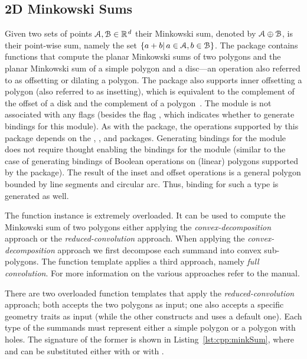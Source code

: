 \subsection{2D Minkowski Sums}
\label{ssec:modules:ms2}
Given two sets of points $\calA, \calB \in \Rd$ their Minkowski sum, denoted by ${\cal A} \oplus {\cal B}$, is their point-wise sum, namely the set $\{a+b |\, a \in {\cal A},b \in {\cal B}\}$. The \cgal{} package \iiDMinkowskiSumsPackage{} contains functions that compute the planar Minkowski sums of two polygons and the planar Minkowski sum of a simple polygon and a disc---an operation also referred to as offsetting or dilating a polygon. The package also supports inner offsetting a polygon (also referred to as insetting), which is equivalent to the complement of the offset of a disk and the complement of a polygon~\cite{cgal:w-rms2-21a}. The \iiDMinkowskiSumsPackage{} module is not associated with any \cmake{} flags (besides the flag , which indicates whether to generate bindings for this module). As with the \iiDRegularizedBooleanSetOperationsPackage{} package, the operations supported by this package depends on the \iiDandiiiDGeometryKernelPackage{}, \iiDArrangementsPackage{}, and \iiDPolygonsPackage{} packages. Generating bindings for the \iiDMinkowskiSumsPackage{} module does not require thought enabling the bindings for the \iiDArrangementsPackage{} module (similar to the case of generating bindings of Boolean operations on (linear) polygons supported by the \iiDRegularizedBooleanSetOperationsPackage{} package). The result of the inset and offset operations is a general polygon bounded by line segments and circular arc. Thus, binding for such a type is generated as well.

The function instance  is extremely overloaded. It can be used to compute the Minkowski sum of two polygons either applying the \emph{convex-decomposition} approach or the \emph{reduced-convolution} approach. When applying the \emph{convex-decomposition} approach we first decompose each summand into convex sub-polygons. The function template  applies a third approach, namely \emph{full convolution}. For more information on the various approaches refer to the manual.

There are two overloaded function templates  that apply the \emph{reduced-convolution} approach; both accepts the two polygons as input; one also accepts a specific geometry traits as input (while the other constructs and uses a default one). Each type of the summands must represent either a simple polygon or a polygon with holes. The signature of the former is shown in Listing~\ref{lst:cpp:minkSum}, where  and  can be substituted either with  or with .

